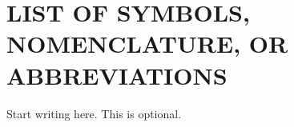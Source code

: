 

\chapter*{LIST OF SYMBOLS, NOMENCLATURE, OR ABBREVIATIONS}  Start
writing here. This is optional.


